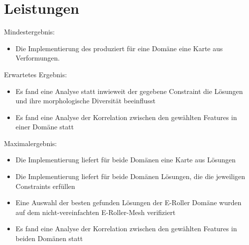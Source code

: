 \documentclass[12pt]{article}
\begin{document}
\section{Leistungen}
Mindestergebnis:
\begin{itemize}  
\item Die Implementierung des produziert für eine Domäne eine Karte aus Verformungen.
\end{itemize}
Erwartetes Ergebnis:
\begin{itemize}  
\item Es fand eine Analyse statt inwieweit der gegebene Constraint die Lösungen und ihre morphologische Diversität beeinflusst
\item Es fand eine Analyse der Korrelation zwischen den gewählten Features in einer Domäne statt
\end{itemize}
Maximalergebnis:
\begin{itemize}  
\item Die Implementierung liefert für beide Domänen eine Karte aus Lösungen
\item Die Implementierung liefert für beide Domänen Lösungen, die die jeweiligen Constraints erfüllen
\item Eine Auswahl der besten gefunden Lösungen der E-Roller Domäne wurden auf dem nicht-vereinfachten E-Roller-Mesh verifiziert
\item Es fand eine Analyse der Korrelation zwischen den gewählten Features in beiden Domänen statt
\end{itemize}

\newpage{}

\end{document}
